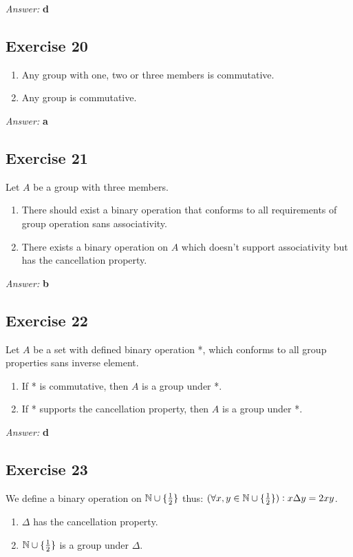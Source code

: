 \documentclass[11pt]{article}
\begin{document}
\emph{Answer:} \textbf{d}
\subsection{Exercise 20}
\label{sec-2-20}
\begin{enumerate}
\item Any group with one, two or three members is commutative.
\item Any group is commutative.
\end{enumerate}

\emph{Answer:} \textbf{a}
\subsection{Exercise 21}
\label{sec-2-21}
Let $A$ be a group with three members.
\begin{enumerate}
\item There should exist a binary operation that conforms to all requirements of 
group operation sans associativity.
\item There exists a binary operation on $A$ which doesn't support associativity
but has the cancellation property.
\end{enumerate}

\emph{Answer:} \textbf{b}
\subsection{Exercise 22}
\label{sec-2-22}
Let $A$ be a set with defined binary operation *, which conforms to all
group properties sans inverse element.
\begin{enumerate}
\item If * is commutative, then $A$ is a group under *.
\item If * supports the cancellation property, then $A$ is a group under *.
\end{enumerate}

\emph{Answer:} \textbf{d}
\subsection{Exercise 23}
\label{sec-2-23}
We define a binary operation on $\mathbb{N} \cup \{{1\over 2}\}$ thus:
$(\forall x, y \in \mathbb{N} \cup \{{1\over 2}\}): x \Delta y = 2xy$.
\begin{enumerate}
\item $\Delta$ has the cancellation property.
\item $\mathbb{N} \cup \{{1\over 2}\}$ is a group under $\Delta$.
\end{enumerate}
\end{document}
